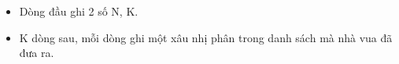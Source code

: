 \begin{itemize}
	\item Dòng đầu ghi 2 số N, K.
	\item K dòng sau, mỗi dòng ghi một xâu nhị phân trong danh sách mà nhà vua đã đưa ra.
\end{itemize}